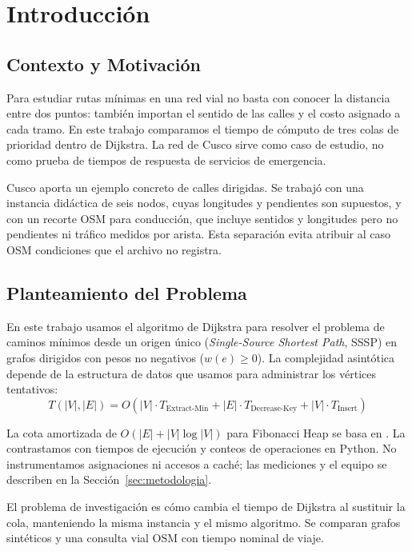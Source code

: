 \section{Introducción}
\label{sec:introduccion}

\subsection{Contexto y Motivación}
Para estudiar rutas mínimas en una red vial no basta con conocer la distancia entre dos puntos: también importan el sentido de las calles y el costo asignado a cada tramo. En este trabajo comparamos el tiempo de cómputo de tres colas de prioridad dentro de Dijkstra. La red de Cusco sirve como caso de estudio, no como prueba de tiempos de respuesta de servicios de emergencia.

Cusco aporta un ejemplo concreto de calles dirigidas. Se trabajó con una instancia didáctica de seis nodos, cuyas longitudes y pendientes son supuestos, y con un recorte OSM para conducción, que incluye sentidos y longitudes pero no pendientes ni tráfico medidos por arista. Esta separación evita atribuir al caso OSM condiciones que el archivo no registra.

\subsection{Planteamiento del Problema}
En este trabajo usamos el algoritmo de Dijkstra \parencite{dijkstra1959note} para resolver el problema de caminos mínimos desde un origen único (\textit{Single-Source Shortest Path}, SSSP) en grafos dirigidos con pesos no negativos ($w(e) \ge 0$). La complejidad asintótica depende de la estructura de datos que usamos para administrar los vértices tentativos:
\begin{equation}
    T(|V|, |E|) = O(|V| \cdot T_{\text{Extract-Min}} + |E| \cdot T_{\text{Decrease-Key}} + |V| \cdot T_{\text{Insert}})
\end{equation}

La cota amortizada de $O(|E| + |V| \log |V|)$ para Fibonacci Heap se basa en \textcite{fredman1987fibonacci}. La contrastamos con tiempos de ejecución y conteos de operaciones en Python. No instrumentamos asignaciones ni accesos a caché; las mediciones y el equipo se describen en la Sección~\ref{sec:metodologia}.

El problema de investigación es cómo cambia el tiempo de Dijkstra al sustituir la cola, manteniendo la misma instancia y el mismo algoritmo. Se comparan grafos sintéticos y una consulta vial OSM con tiempo nominal de viaje.


